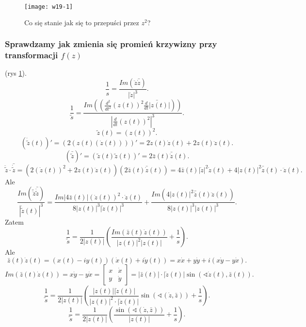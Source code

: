 \documentclass[../main.tex]{subfiles}
\begin{document}
     \begin{figure}[h]
        \centering
        \texttt{[image: w19-1]}
        \caption{Co się stanie jak się to przepuści przez $z^2$?}
        \label{fig:w19-1}
    \end{figure}
    \subsubsection{Sprawdzamy jak zmienia się promień krzywizny przy transformacji $f(z)$} (rys \ref{fig:w19-1}).
    \[
        \frac{1}{s} = \frac{Im(\ddot{z}\bar{\dot{z}})}{\left| \dot{z} \right| ^3}
    .\]
\[
    \frac{1}{\tilde s} = \frac{Im\left(\left(\frac{d^2}{dt^2}\left( z(t) \right) ^2 \bar{\frac{d}{dt}|z(t)|}\right)\right)}{\left| \frac{d}{dt}\left( z(t) \right) ^2 \right| ^3}
.\]
\[
    \tilde z (t) = \left( z(t) \right) ^2
.\]
\[
    \left( \dot{\tilde z}(t) \right)' = \left( 2\left(z(t)\left( \dot{z}(t) \right) \right) \right)' = 2 \dot{z}(t) \dot{z}(t) + 2z(t) \ddot{z}(t)
.\]
\[
    \left( \bar{\tilde z} \right)' = \left( \tilde z(t) \tilde z(t) \right)' = 2 \bar{z}(t) \bar{\dot{z}}(t)
.\]
\[
    \ddot{\tilde z} \cdot \bar{\dot{\tilde z}} = \left( 2(\dot{z}(t))^2 + 2z(t)\ddot{z}(t)\right)\left( 2\bar{z}(t)\bar{\dot{z}}(t) \right) = 4\bar{z}(t) \left| \dot{z} \right| ^2 \dot{z}(t) + 4\left| z(t) \right| ^2 \bar{\dot{z}}(t) \cdot \ddot{z}(t)
.\]
Ale
\[
    \frac{Im( \tilde \ddot{z} \bar{\dot{\tilde z}})}{\left| \dot{\tilde z}(t) \right|^3 } = \frac{Im\left| 4\bar{z}(t) \right| (\dot{z}(t))^2 \cdot \dot{z}(t)}{8\left| z(t) \right| ^3 \left| \dot{z}(t) \right| ^3} + \frac{Im(4 \left| z(t) \right| ^2 \bar{\dot{z}}(t) \ddot{z}(t))}{8\left| z(t) \right| ^3 \left| z(t) \right| ^3}
.\]
Zatem
\[
    \frac{1}{\tilde s} = \frac{1}{2\left| z(t) \right| }\left( \frac{Im\left( \bar{z}(t)\dot{z}(t) \right) }{\left| z(t) \right| ^2 \left| z(t) \right|} + \frac{1}{s} \right)
.\]
Ale
\[
    \bar{z}(t) \dot{z}(t) = \left( x(t) - iy(t) \right) \left( \dot{x}(t) + i\dot{y}(t) \right) = x\dot{x} + y\dot{y} + i\left( x\dot{y} - y\dot{x} \right)
.\]
\[
    Im\left( \bar{z}(t)\dot{z}(t) \right) = x\dot{y} - y\dot{x} = \begin{bmatrix} x&\dot{x}\\ y&\dot{y} \end{bmatrix} = \left| \bar{z}(t) \right|\cdot \left| \dot{z}(t) \right| \sin(\sphericalangle \dot{z}(t), \bar{z}(t))
.\]
\[
    \frac{1}{\tilde s} = \frac{1}{2\left| z(t) \right| }\left( \frac{\left| z(t) \right| \left| \dot{z}(t) \right| }{\left| z(t) \right| ^2 \cdot \left| \dot{z}(t) \right| } \sin(\sphericalangle(\dot{z}, \bar{z})) + \frac{1}{s}\right)
.\]
\[
    \frac{1}{\tilde s} = \frac{1}{2 \left| z(t) \right| } \left( \frac{\sin(\sphericalangle(\dot{z}, \bar{z}))}{\left| z(t) \right| } + \frac{1}{s} \right)
.\]
\end{document}
